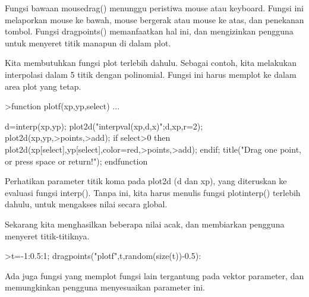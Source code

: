 \documentclass{article}
\begin{document}
\begin{eulernotebook}
\begin{eulercomment}
\begin{eulercomment}
\begin{eulercomment}
\begin{eulercomment}
\begin{eulercomment}
\begin{eulercomment}
\begin{eulercomment}
Fungsi bawaan mousedrag() menunggu peristiwa mouse atau keyboard.
Fungsi ini melaporkan mouse ke bawah, mouse bergerak atau mouse ke
atas, dan penekanan tombol. Fungsi dragpoints() memanfaatkan hal ini,
dan mengizinkan pengguna untuk menyeret titik manapun di dalam plot.

Kita membutuhkan fungsi plot terlebih dahulu. Sebagai contoh, kita
melakukan interpolasi dalam 5 titik  dengan polinomial. Fungsi ini
harus memplot ke dalam area plot yang tetap.
\end{eulercomment}
\begin{eulerprompt}
>function plotf(xp,yp,select) ...
\end{eulerprompt}
\begin{eulerudf}
    d=interp(xp,yp);
    plot2d("interpval(xp,d,x)";d,xp,r=2);
    plot2d(xp,yp,>points,>add);
    if select>0 then
      plot2d(xp[select],yp[select],color=red,>points,>add);
    endif;
    title("Drag one point, or press space or return!");
  endfunction
\end{eulerudf}
\begin{eulercomment}
Perhatikan parameter titik koma pada plot2d (d dan xp), yang
diteruskan ke evaluasi fungsi interp(). Tanpa ini, kita harus menulis
fungsi plotinterp() terlebih dahulu, untuk mengakses nilai secara
global.

Sekarang kita menghasilkan beberapa nilai acak, dan membiarkan
pengguna menyeret titik-titiknya.
\end{eulercomment}
\begin{eulerprompt}
>t=-1:0.5:1; dragpoints("plotf",t,random(size(t))-0.5):
\end{eulerprompt}
\begin{eulercomment}
Ada juga fungsi yang memplot fungsi lain tergantung pada vektor
parameter, dan memungkinkan pengguna menyesuaikan parameter ini.


\end{eulercomment}
\end{eulercomment}
\end{eulercomment}
\end{eulercomment}
\end{eulercomment}
\end{eulercomment}
\end{eulercomment}
\end{eulernotebook}
\end{document}
